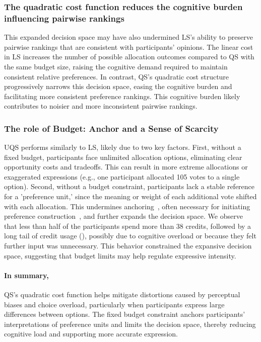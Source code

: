 \subsubsection{The quadratic cost function reduces the cognitive burden influencing pairwise rankings}
This expanded decision space may have also undermined LS's ability to preserve pairwise rankings that are consistent with participants' opinions. The linear cost in LS increases the number of possible allocation outcomes compared to QS with the same budget size, raising the cognitive demand required to maintain consistent relative preferences. In contrast, QS's quadratic cost structure progressively narrows this decision space, easing the cognitive burden and facilitating more consistent preference rankings. This cognitive burden likely contributes to noisier and more inconsistent pairwise rankings. %

\subsubsection{The role of Budget: Anchor and a Sense of Scarcity}
UQS performs similarly to LS, likely due to two key factors. First, without a fixed budget, participants face unlimited allocation options, eliminating clear opportunity costs and tradeoffs. This can result in more extreme allocations or exaggerated expressions (e.g., one participant allocated 105 votes to a single option). Second, without a budget constraint, participants lack a stable reference for a 'preference unit,' since the meaning or weight of each additional vote shifted with each allocation. This undermines anchoring~\cite{daniel2017thinking, tverskyJudgmentUncertaintyHeuristics1974}, often necessary for initiating preference construction~\cite{lichtensteinConstructionPreference2006}, and further expands the decision space. We observe that less than half of the participants spend more than 38 credits, followed by a long tail of credit usage (), possibly due to cognitive overload or because they felt further input was unnecessary. This behavior constrained the expansive decision space, suggesting that budget limits may help regulate expressive intensity.

\paragraph{In summary,} QS's quadratic cost function helps mitigate distortions caused by perceptual biases and choice overload, particularly when participants express large differences between options. The fixed budget constraint anchors participants' interpretations of preference units and limits the decision space, thereby reducing cognitive load and supporting more accurate expression.

